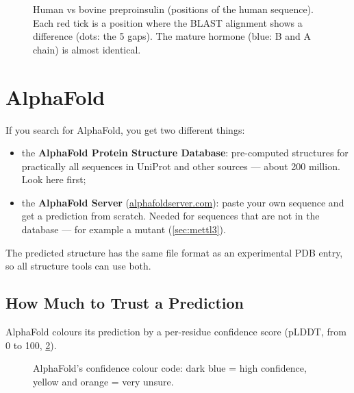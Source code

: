 \documentclass[11pt, oneside]{book}
\let\originalsection\section
\renewcommand{\section}{\Needspace{7\baselineskip}\originalsection}
\let\originalsubsection\subsection
\renewcommand{\subsection}{\Needspace{6\baselineskip}\originalsubsection}
\begin{document}
\begin{figure}[htbp]
\caption{Human vs bovine preproinsulin (positions of the human sequence). Each
red tick is a position where the BLAST alignment shows a difference (dots: the
5 gaps). The mature hormone (blue: B and A chain) is almost identical.}
\label{fig:insulin}
\end{figure}

\section{AlphaFold}
\label{sec:alphafold}

If you search for AlphaFold, you get two different things:
\begin{itemize}
  \item the \textbf{AlphaFold Protein Structure Database}: pre-computed
    structures for practically all sequences in UniProt and other sources ---
    about 200 million. Look here first;
  \item the \textbf{AlphaFold Server} (\url{alphafoldserver.com}): paste your
    own sequence and get a prediction from scratch. Needed for sequences that
    are not in the database --- for example a mutant (\cref{sec:mettl3}).
\end{itemize}
The predicted structure has the same file format as an experimental PDB entry,
so all structure tools can use both.

\subsection{How Much to Trust a Prediction}

AlphaFold colours its prediction by a per-residue confidence score (pLDDT,
from 0 to 100, \cref{fig:plddt}).

\begin{figure}[htbp]
\centering
{}
\caption{AlphaFold's confidence colour code: dark blue = high confidence,
yellow and orange = very unsure.}
\label{fig:plddt}
\end{figure}
\end{document}
